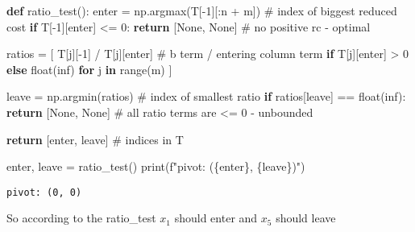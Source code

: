 \documentclass[
  letterpaper,
  DIV=11,
  numbers=noendperiod]{scrartcl}
\newenvironment{Shaded}{\begin{snugshade}}{\end{snugshade}}
\newcommand{\BuiltInTok}[1]{\textcolor[rgb]{0.00,0.23,0.31}{#1}}
\newcommand{\CommentTok}[1]{\textcolor[rgb]{0.37,0.37,0.37}{#1}}
\newcommand{\ControlFlowTok}[1]{\textcolor[rgb]{0.00,0.23,0.31}{\textbf{#1}}}
\newcommand{\DecValTok}[1]{\textcolor[rgb]{0.68,0.00,0.00}{#1}}
\newcommand{\KeywordTok}[1]{\textcolor[rgb]{0.00,0.23,0.31}{\textbf{#1}}}
\newcommand{\NormalTok}[1]{\textcolor[rgb]{0.00,0.23,0.31}{#1}}
\newcommand{\OperatorTok}[1]{\textcolor[rgb]{0.37,0.37,0.37}{#1}}
\newcommand{\SpecialCharTok}[1]{\textcolor[rgb]{0.37,0.37,0.37}{#1}}
\newcommand{\SpecialStringTok}[1]{\textcolor[rgb]{0.13,0.47,0.30}{#1}}
\newcommand{\StringTok}[1]{\textcolor[rgb]{0.13,0.47,0.30}{#1}}
\newcommand{\VariableTok}[1]{\textcolor[rgb]{0.07,0.07,0.07}{#1}}
\begin{document}
\begin{Shaded}
\begin{Highlighting}[]
\KeywordTok{def}\NormalTok{ ratio\_test():}
\NormalTok{    enter }\OperatorTok{=}\NormalTok{ np.argmax(T[}\OperatorTok{{-}}\DecValTok{1}\NormalTok{][:n }\OperatorTok{+}\NormalTok{ m]) }\CommentTok{\# index of biggest reduced cost}
    \ControlFlowTok{if}\NormalTok{ T[}\OperatorTok{{-}}\DecValTok{1}\NormalTok{][enter] }\OperatorTok{\textless{}=} \DecValTok{0}\NormalTok{:}
        \ControlFlowTok{return}\NormalTok{ [}\VariableTok{None}\NormalTok{, }\VariableTok{None}\NormalTok{] }\CommentTok{\# no positive rc {-} optimal}

\NormalTok{    ratios }\OperatorTok{=}\NormalTok{ [}
\NormalTok{        T[j][}\OperatorTok{{-}}\DecValTok{1}\NormalTok{] }\OperatorTok{/}\NormalTok{ T[j][enter] }\CommentTok{\# b term / entering column term}
        \ControlFlowTok{if}\NormalTok{ T[j][enter] }\OperatorTok{\textgreater{}} \DecValTok{0}
        \ControlFlowTok{else} \BuiltInTok{float}\NormalTok{(}\StringTok{\textquotesingle{}inf\textquotesingle{}}\NormalTok{)}
        \ControlFlowTok{for}\NormalTok{ j }\KeywordTok{in} \BuiltInTok{range}\NormalTok{(m)}
\NormalTok{    ]}

\NormalTok{    leave }\OperatorTok{=}\NormalTok{ np.argmin(ratios) }\CommentTok{\# index of smallest ratio}
    \ControlFlowTok{if}\NormalTok{ ratios[leave] }\OperatorTok{==} \BuiltInTok{float}\NormalTok{(}\StringTok{\textquotesingle{}inf\textquotesingle{}}\NormalTok{):}
        \ControlFlowTok{return}\NormalTok{ [}\VariableTok{None}\NormalTok{, }\VariableTok{None}\NormalTok{] }\CommentTok{\# all ratio terms are \textless{}= 0 {-} unbounded}

    \ControlFlowTok{return}\NormalTok{ [enter, leave] }\CommentTok{\# indices in T}

\NormalTok{enter, leave }\OperatorTok{=}\NormalTok{ ratio\_test()}
\BuiltInTok{print}\NormalTok{(}\SpecialStringTok{f"pivot: (}\SpecialCharTok{\{}\NormalTok{enter}\SpecialCharTok{\}}\SpecialStringTok{, }\SpecialCharTok{\{}\NormalTok{leave}\SpecialCharTok{\}}\SpecialStringTok{)"}\NormalTok{)}
\end{Highlighting}
\end{Shaded}

\begin{verbatim}
pivot: (0, 0)
\end{verbatim}

So according to the ratio\_test \(x_1\) should enter and \(x_5\) should
leave
\end{document}
